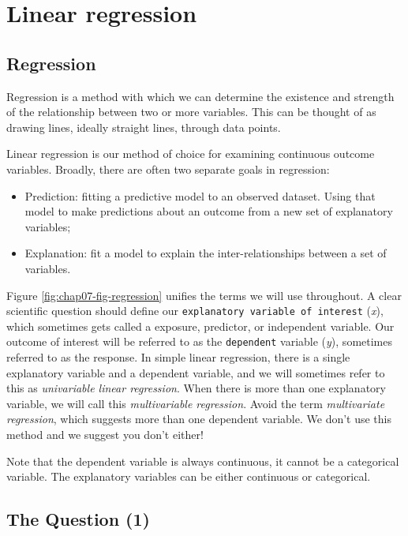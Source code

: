 \documentclass[12pt,]{krantz}
\providecommand{\tightlist}{%
  \setlength{\itemsep}{0pt}\setlength{\parskip}{0pt}}
\theoremstyle{definition}
\theoremstyle{definition}
\theoremstyle{definition}
\theoremstyle{remark}
\begin{document}
\hypertarget{linear-regression}{%
\chapter{Linear regression}\label{linear-regression}}

\hypertarget{regression}{%
\section{Regression}\label{regression}}

Regression is a method with which we can determine the existence and
strength of the relationship between two or more variables. This can be
thought of as drawing lines, ideally straight lines, through data
points.

Linear regression is our method of choice for examining continuous
outcome variables. Broadly, there are often two separate goals in
regression:

\begin{itemize}
\tightlist
\item
  Prediction: fitting a predictive model to an observed dataset. Using
  that model to make predictions about an outcome from a new set of
  explanatory variables;
\item
  Explanation: fit a model to explain the inter-relationships between a
  set of variables.
\end{itemize}

Figure \ref{fig:chap07-fig-regression} unifies the terms we will use
throughout. A clear scientific question should define our
\texttt{explanatory\ variable\ of\ interest} (\emph{x}), which sometimes
gets called a exposure, predictor, or independent variable. Our outcome
of interest will be referred to as the \texttt{dependent} variable
(\emph{y}), sometimes referred to as the response. In simple linear
regression, there is a single explanatory variable and a dependent
variable, and we will sometimes refer to this as \emph{univariable
linear regression}. When there is more than one explanatory variable, we
will call this \emph{multivariable regression}. Avoid the term
\emph{multivariate regression}, which suggests more than one dependent
variable. We don't use this method and we suggest you don't either!

Note that the dependent variable is always continuous, it cannot be a
categorical variable. The explanatory variables can be either continuous
or categorical.

\hypertarget{the-question-1}{%
\section{The Question (1)}\label{the-question-1}}
\end{document}

